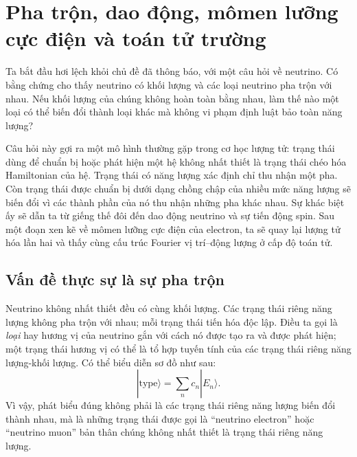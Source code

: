 \chapter{Pha trộn, dao động, mômen lưỡng cực điện và toán tử trường}

Ta bắt đầu hơi lệch khỏi chủ đề đã thông báo, với một câu hỏi về neutrino. Có bằng chứng cho thấy neutrino có khối lượng và các loại neutrino pha trộn với nhau. Nếu khối lượng của chúng không hoàn toàn bằng nhau, làm thế nào một loại có thể biến đổi thành loại khác mà không vi phạm định luật bảo toàn năng lượng?

Câu hỏi này gợi ra một mô hình thường gặp trong cơ học lượng tử: trạng thái dùng để chuẩn bị hoặc phát hiện một hệ không nhất thiết là trạng thái chéo hóa Hamiltonian của hệ. Trạng thái có năng lượng xác định chỉ thu nhận một pha. Còn trạng thái được chuẩn bị dưới dạng chồng chập của nhiều mức năng lượng sẽ biến đổi vì các thành phần của nó thu nhận những pha khác nhau. Sự khác biệt ấy sẽ dẫn ta từ giếng thế đôi đến dao động neutrino và sự tiến động spin. Sau một đoạn xen kẽ về mômen lưỡng cực điện của electron, ta sẽ quay lại lượng tử hóa lần hai và thấy cùng cấu trúc Fourier vị trí--động lượng ở cấp độ toán tử.

\section{Vấn đề thực sự là sự pha trộn}

Neutrino không nhất thiết đều có cùng khối lượng. Các trạng thái riêng năng lượng không pha trộn với nhau; mỗi trạng thái tiến hóa độc lập. Điều ta gọi là \emph{loại} hay hương vị của neutrino gắn với cách nó được tạo ra và được phát hiện; một trạng thái hương vị có thể là tổ hợp tuyến tính của các trạng thái riêng năng lượng-khối lượng. Có thể biểu diễn sơ đồ như sau:
\begin{equation}
|\text{type}\rangle = \sum_n c_n |E_n\rangle .
\end{equation}
Vì vậy, phát biểu đúng không phải là các trạng thái riêng năng lượng biến đổi thành nhau, mà là những trạng thái được gọi là ``neutrino electron'' hoặc ``neutrino muon'' bản thân chúng không nhất thiết là trạng thái riêng năng lượng.

\begin{classroomqa}
\end{classroomqa}


